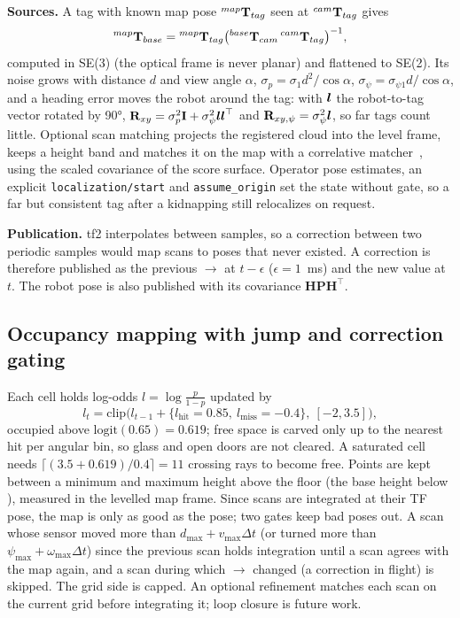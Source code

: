 \textbf{Sources.} A tag with known map pose ${}^{map}\mathbf{T}_{tag}$ seen at ${}^{cam}\mathbf{T}_{tag}$ gives
\begin{equation}
  {}^{map}\mathbf{T}_{base} = {}^{map}\mathbf{T}_{tag} \big({}^{base}\mathbf{T}_{cam}\, {}^{cam}\mathbf{T}_{tag}\big)^{-1},
\end{equation}
computed in SE(3) (the optical frame is never planar) and flattened to SE(2). Its noise grows
with distance $d$ and view angle $\alpha$, $\sigma_p = \sigma_1 d^2/\cos\alpha$,
$\sigma_\psi = \sigma_{\psi1} d/\cos\alpha$, and a heading error moves the robot around the tag:
with $\boldsymbol{l}$ the robot-to-tag vector rotated by 90°, $\mathbf{R}_{xy} = \sigma_p^2\mathbf{I} +
\sigma_\psi^2\boldsymbol{l}\boldsymbol{l}^\top$ and $\mathbf{R}_{xy,\psi} = \sigma_\psi^2\boldsymbol{l}$, so far
tags count little. Optional scan matching projects the registered cloud into the level frame,
keeps a height band and matches it on the map with a correlative matcher~\cite{olson2009csm},
using the scaled covariance of the score surface. Operator pose estimates, an explicit
\texttt{localization/start} and \texttt{assume\_origin} set the state without gate, so a far
but consistent tag after a kidnapping still relocalizes on request.

\textbf{Publication.} tf2 interpolates between samples, so a correction between two periodic
samples would map scans to poses that never existed. A correction is therefore published as
the previous $\to$ at $t-\epsilon$ ($\epsilon = 1$~ms) and the new value at
$t$. The robot pose is also published with its covariance $\mathbf{H}\mathbf{P}\mathbf{H}^\top$.

\subsection{Occupancy mapping with jump and correction gating}
\label{sec:map}

Each cell holds log-odds $l = \log\frac{p}{1-p}$ updated by
\begin{equation}
  l_t = \mathrm{clip}\big(l_{t-1} + \{l_{\mathrm{hit}} = 0.85,\ l_{\mathrm{miss}} = -0.4\},\
  [-2, 3.5]\big),
\end{equation}
occupied above $\mathrm{logit}(0.65) = 0.619$; free space is carved only up to the nearest hit
per angular bin, so glass and open doors are not cleared. A saturated cell needs
$\lceil (3.5 + 0.619)/0.4 \rceil = 11$ crossing rays to become free. Points are kept between a
minimum and maximum height above the floor (the base height below \frm{base\_link}), measured in
the levelled map frame. Since scans are integrated at their TF pose, the map is only as good as
the pose; two gates keep bad poses out. A scan whose sensor moved more than
$d_{\max} + v_{\max}\Delta t$ (or turned more than $\psi_{\max} + \omega_{\max}\Delta t$) since
the previous scan holds integration until a scan agrees with the map again, and a scan during
which \frm{map}$\to$\frm{odom} changed (a correction in flight) is skipped. The grid side is
capped. An optional refinement matches each scan on the current grid before integrating it;
loop closure is future work.

